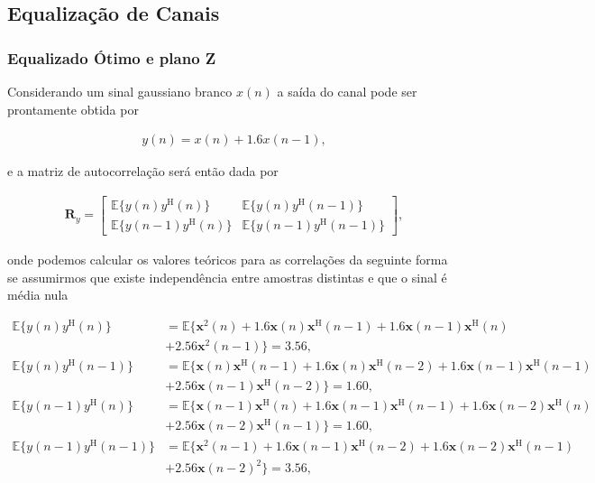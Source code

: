 \clearpage


\subsection{Equalização de Canais} %


\subsubsection{Equalizado Ótimo e plano Z}
    
Considerando um sinal gaussiano branco $x(n)$ a saída do canal pode ser prontamente obtida por

\begin{align}
    y(n) = x(n) + 1.6 x(n - 1),
\end{align}

e a matriz de autocorrelação será então dada por

\begin{align}
    \mathbf{R}_{y} =
    \begin{bmatrix}
        \mathbb{E}\{y(n)y^{\text{H}}(n)\} & \mathbb{E}\{y(n)y^{\text{H}}(n - 1)\} \\
        \mathbb{E}\{y(n - 1)y^{\text{H}}(n)\} & \mathbb{E}\{y(n - 1)y^{\text{H}}(n - 1)\}
    \end{bmatrix},
\end{align}

onde podemos calcular os valores teóricos para as correlações da seguinte forma se assumirmos que existe independência entre amostras distintas e que o sinal é média nula 

\begin{align*}
    \mathbb{E}\{y(n)y^{\text{H}}(n)\} &= \mathbb{E}\{ \mathbf{x}^{2}(n) + 1.6 \mathbf{x}(n) \mathbf{x}^{\text{H}}(n - 1) + 1.6 \mathbf{x}(n - 1) \mathbf{x}^{\text{H}} (n) \\
    &+ 2.56 \mathbf{x}^{2}(n - 1) \} = 3.56, \\
    \mathbb{E}\{y(n)y^{\text{H}}(n - 1)\} &= \mathbb{E}\{ \mathbf{x}(n) \mathbf{x}^{\text{H}}(n - 1) + 1.6 \mathbf{x}(n) \mathbf{x}^{\text{H}}(n - 2) + 1.6 \mathbf{x}(n - 1) \mathbf{x}^{\text{H}} (n - 1) \\ 
    &+ 2.56 \mathbf{x}(n - 1) \mathbf{x}^{\text{H}}(n - 2) \} = 1.60, \\
    \mathbb{E}\{y(n - 1)y^{\text{H}}(n)\} &= \mathbb{E}\{ \mathbf{x}(n - 1) \mathbf{x}^{\text{H}}(n) + 1.6 \mathbf{x}(n - 1) \mathbf{x}^{\text{H}}(n - 1) + 1.6 \mathbf{x}(n - 2) \mathbf{x}^{\text{H}} (n) \\ 
    &+ 2.56 \mathbf{x}(n - 2) \mathbf{x}^{\text{H}}(n - 1) \} = 1.60, \\
    \mathbb{E}\{y(n - 1)y^{\text{H}}(n - 1)\} &= \mathbb{E}\{ \mathbf{x}^{2}(n - 1) + 1.6 \mathbf{x}(n - 1) \mathbf{x}^{\text{H}}(n - 2) + 1.6 \mathbf{x}(n - 2) \mathbf{x}^{\text{H}} (n - 1) \\ 
    &+ 2.56 \mathbf{x}(n - 2)^{2} \} = 3.56, \\
\end{align*}

